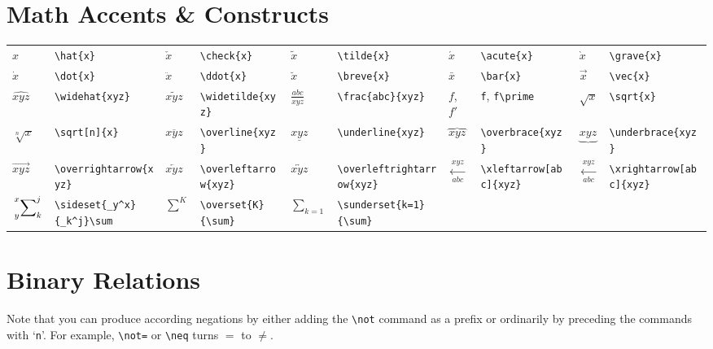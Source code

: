 \documentclass[10pt, english]{article}
\begin{document}
\section{Math Accents \& Constructs}

	\begin{center}
		\scriptsize
	\begin{tabular}{ll|ll|ll|ll|ll}
		$\hat{x}$ & \verb|\hat{x}| & $\check{x}$ & \verb|\check{x}| & $\tilde{x}$ & \verb|\tilde{x}| & $\acute{x}$ & \verb|\acute{x}| & $\grave{x}$ & \verb|\grave{x}|\\
		$\dot{x}$ & \verb|\dot{x}| & $\ddot{x}$ & \verb|\ddot{x}| & $\breve{x}$ & \verb|\breve{x}| & $\bar{x}$ & \verb|\bar{x}| & $\vec{x}$ & \verb|\vec{x}|\\
		$\widehat{xyz}$ & \verb|\widehat{xyz}| & $\widetilde{xyz}$ & \verb|\widetilde{xyz}| & $\frac{abc}{xyz}$ & \verb|\frac{abc}{xyz}| & $f$, $f\prime$ & \verb|f|, \verb|f\prime| & $\sqrt{x}$ & \verb|\sqrt{x}|\\
		$\sqrt[n]{x}$ & \verb|\sqrt[n]{x}| & $\overline{xyz}$ & \verb|\overline{xyz}| & $\underline{xyz}$ & \verb|\underline{xyz}| & $\overbrace{xyz}$ & \verb|\overbrace{xyz}| & $\underbrace{xyz}$ & \verb|\underbrace{xyz}|\\
		$\overrightarrow{xyz}$ & \verb|\overrightarrow{xyz}| & $\overleftarrow{xyz}$ & \verb|\overleftarrow{xyz}| & $\overleftrightarrow{xyz}$ & \verb|\overleftrightarrow{xyz}| & $\xleftarrow[abc]{xyz}$ & \verb|\xleftarrow[abc]{xyz}| & $\xleftarrow[abc]{xyz}$ & \verb|\xrightarrow[abc]{xyz}| \\
		$\sideset{_y^x}{_k^j}\sum$ & \verb|\sideset{_y^x}{_k^j}\sum| & $\overset{K}{\sum}$ & \verb|\overset{K}{\sum}| & $\underset{k=1}{\sum}$ & \verb|\sunderset{k=1}{\sum}| \\
	\end{tabular}
	\end{center}

\section{Binary Relations}

	Note that you can produce according negations by either adding the \verb|\not| command as a prefix or ordinarily by preceding the commands with `\verb|n|'. For example, \verb|\not=| or \verb|\neq| turns $=$ to $\neq$.
\end{document}
